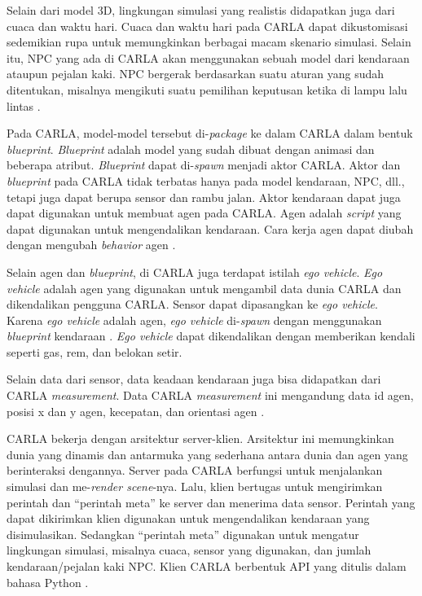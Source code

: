 Selain dari model 3D, lingkungan simulasi yang realistis didapatkan juga dari
cuaca dan waktu hari. Cuaca dan waktu hari pada CARLA dapat dikustomisasi
sedemikian rupa untuk memungkinkan berbagai macam skenario simulasi.
Selain itu, NPC yang ada di CARLA akan menggunakan sebuah model dari kendaraan
ataupun pejalan kaki. NPC bergerak berdasarkan suatu aturan yang sudah
ditentukan, misalnya mengikuti suatu pemilihan keputusan ketika di lampu lalu
lintas \parencite{dos_carla}.

Pada CARLA, model-model tersebut di-\textit{package} ke dalam CARLA dalam bentuk
\textit{blueprint}. \textit{Blueprint} adalah model yang sudah dibuat dengan
animasi dan beberapa atribut. \textit{Blueprint} dapat di-\textit{spawn} menjadi
aktor CARLA. Aktor dan \textit{blueprint} pada CARLA tidak terbatas hanya pada
model kendaraan, NPC, dll., tetapi juga dapat berupa sensor dan rambu jalan.
Aktor kendaraan dapat juga dapat digunakan untuk membuat agen pada CARLA. Agen
adalah \textit{script} yang dapat digunakan untuk mengendalikan kendaraan. Cara
kerja agen dapat diubah dengan mengubah \textit{behavior} agen
\parencite{x_carlaDocs}.

Selain agen dan \textit{blueprint}, di CARLA juga terdapat istilah \textit{ego
	vehicle}. \textit{Ego vehicle} adalah agen yang digunakan untuk mengambil
data dunia CARLA dan dikendalikan pengguna CARLA. Sensor dapat dipasangkan
ke \textit{ego vehicle}. Karena \textit{ego vehicle} adalah agen, \textit{ego
	vehicle} di-\textit{spawn} dengan menggunakan \textit{blueprint} kendaraan
\parencite{x_carlaDocs}. \textit{Ego vehicle} dapat dikendalikan dengan
memberikan kendali seperti gas, rem, dan belokan setir.

Selain data dari sensor, data keadaan kendaraan juga bisa didapatkan dari CARLA
\textit{measurement}.  Data CARLA \textit{measurement} ini mengandung data id
agen, posisi x dan y agen, kecepatan, dan orientasi agen
\parencite{trilaksono_laporanRispro}.

CARLA bekerja dengan arsitektur server-klien. Arsitektur ini memungkinkan dunia
yang dinamis dan antarmuka yang sederhana antara dunia dan agen yang
berinteraksi dengannya. Server pada CARLA berfungsi untuk menjalankan simulasi
dan me-\textit{render scene}-nya. Lalu, klien bertugas untuk mengirimkan
perintah dan ``perintah meta'' ke server dan menerima data sensor. Perintah yang
dapat dikirimkan klien digunakan untuk mengendalikan kendaraan yang
disimulasikan. Sedangkan ``perintah meta'' digunakan untuk mengatur lingkungan
simulasi, misalnya cuaca, sensor yang digunakan, dan jumlah kendaraan/pejalan
kaki NPC. Klien CARLA berbentuk API yang ditulis dalam bahasa Python
\parencite{dos_carla}.

